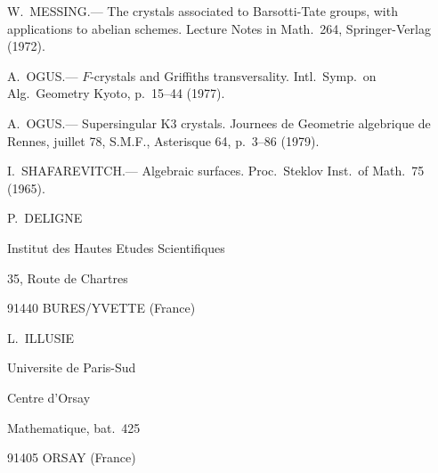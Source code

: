 \documentclass[12pt,a4paper]{article}
\theoremstyle{plain}
\theoremstyle{definition}
\theoremstyle{remark}
\begin{document}
\begin{enumerate}[label={[\arabic*]}, leftmargin=2em, itemsep=0.5ex]
\item W.\ MESSING.--- The crystals associated to Barsotti-Tate groups, with applications to abelian schemes. Lecture Notes in Math.\ 264, Springer-Verlag (1972).

\item A.\ OGUS.--- $F$-crystals and Griffiths transversality. Intl.\ Symp.\ on Alg.\ Geometry Kyoto, p.\ 15--44 (1977).

\item A.\ OGUS.--- Supersingular K3 crystals. Journees de Geometrie algebrique de Rennes, juillet 78, S.M.F., Asterisque 64, p.\ 3--86 (1979).

\item I.\ SHAFAREVITCH.--- Algebraic surfaces. Proc.\ Steklov Inst.\ of Math.\ 75 (1965).
\end{enumerate}

\vspace{1cm}

\noindent
\begin{minipage}[t]{0.45\textwidth}
P.\ DELIGNE

Institut des Hautes Etudes Scientifiques

35, Route de Chartres

91440 BURES/YVETTE (France)
\end{minipage}
\hfill
\begin{minipage}[t]{0.45\textwidth}
L.\ ILLUSIE

Universite de Paris-Sud

Centre d'Orsay

Mathematique, bat.\ 425

91405 ORSAY (France)
\end{minipage}
\end{document}
